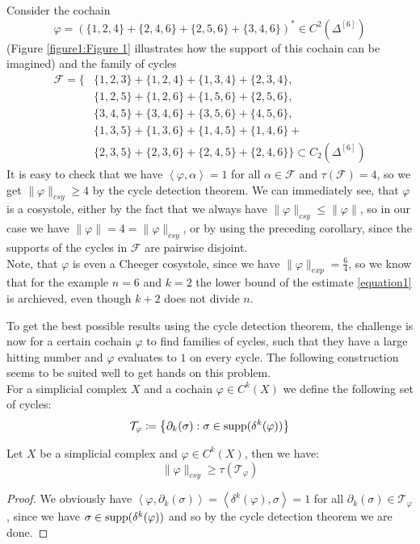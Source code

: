 \begin{expl}\label{example1a}
Consider the cochain
\[
\varphi=\left(\{1,2,4\}+\{2,4,6\}+\{2,5,6\}+\{3,4,6\}\right)^*\in C^2(\Delta^{[6]})
\]
(Figure \ref{figure1:Figure 1} illustrates how the support of this cochain can be imagined) and the family of cycles
\begin{align*}
\mathcal{F}=\{&\{1,2,3\}+\{1,2,4\}+\{1,3,4\}+\{2,3,4\},\\
&\{1,2,5\}+\{1,2,6\}+\{1,5,6\}+\{2,5,6\},\\
&\{3,4,5\}+\{3,4,6\}+\{3,5,6\}+\{4,5,6\},\\
&\{1,3,5\}+\{1,3,6\}+\{1,4,5\}+\{1,4,6\}+\\
&\{2,3,5\}+\{2,3,6\}+\{2,4,5\}+\{2,4,6\}\}\subset C_2(\Delta^{[6]})
\end{align*}
It is easy to check that we have \(\left\langle\varphi,\alpha\right\rangle=1\) for all \(\alpha\in\mathcal{F}\) and \(\tau(\mathcal{F})=4\), so we get \(\|\varphi\|_{csy}\geq 4\) by the cycle detection theorem. We can immediately see, that \(\varphi\) is a cosystole, either by the fact that we always have \(\|\varphi\|_{csy}\leq \|\varphi\|\), so in our case we have \(\|\varphi\|=4=\|\varphi\|_{csy}\), or by using the preceding corollary, since the supports of the cycles in \(\mathcal{F}\) are pairwise disjoint.\\
Note, that \(\varphi\) is even a Cheeger cosystole, since we have \(\|\varphi\|_{exp}=\frac{6}{4}\), so we know that for the example \(n=6\) and \(k=2\) the lower bound of the estimate \ref{equation1} is archieved, even though \(k+2\) does not divide \(n\).
\end{expl}



To get the best possible results using the cycle detection theorem, the challenge is now for a certain cochain \(\varphi\) to find families of cycles, such that they have a large hitting number and \(\varphi\) evaluates to \(1\) on every cycle. The following construction seems to be suited well to get hands on this problem.\\
For a simplicial complex \(X\) and a cochain \(\varphi\in C^k(X)\) we define the following set of cycles:
\[
\mathcal{T}_{\varphi}\coloneqq \left\{\partial_k(\sigma):\sigma\in \mathrm{supp}(\delta^k(\varphi))\right\}
\]

\begin{prop}\label{proposition1a}
Let \(X\) be a simplicial complex and \(\varphi\in C^k(X)\), then we have:
\[
\|\varphi\|_{csy}\geq\tau(\mathcal{T}_{\varphi})
\]
\begin{proof}
We obviously have \(\left\langle\varphi,\partial_k(\sigma)\right\rangle=\left\langle\delta^k(\varphi),\sigma\right\rangle=1\) for all \(\partial_k(\sigma)\in\mathcal{T}_{\varphi}\), since we have \(\sigma\in\mathrm{supp}(\delta^k(\varphi))\) and so by the cycle detection theorem we are done.
\end{proof}
\end{prop}

